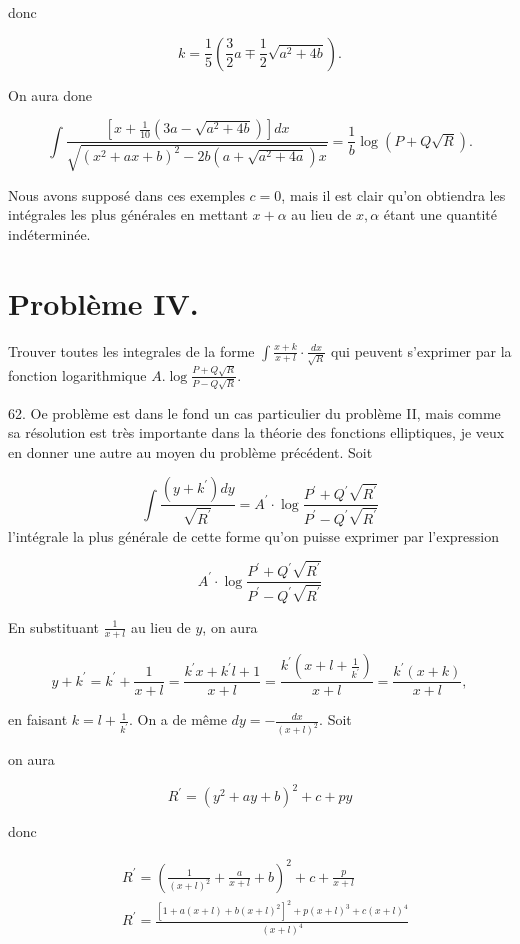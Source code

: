 \documentclass{article}
\begin{document}
donc

\[
k=\frac{1}{5}\left(\frac{3}{2} a \mp \frac{1}{2} \sqrt{a^{2}+4 b}\right) .
\]

On aura done

\[
\int \frac{\left[x+\frac{1}{10}\left(3 a-\sqrt{a^{2}+4 b}\right)\right] d x}{\sqrt{\left(x^{2}+a x+b\right)^{2}-2 b\left(a+\sqrt{a^{2}+4 a}\right) x}}=\frac{1}{b} \log (P+Q \sqrt{R}) .
\]

Nous avons supposé dans ces exemples \(c=0\), mais il est clair qu'on obtiendra les intégrales les plus générales en mettant \(x+\alpha\) au lieu de \(x, \alpha\) étant une quantité indéterminée.

\section*{Problème IV.}

Trouver toutes les integrales de la forme \(\int \frac{x+k}{x+l} \cdot \frac{d x}{\sqrt{R}}\) qui peuvent s'exprimer par la fonction logarithmique \(A . \log \frac{P+Q \sqrt{R}}{P-Q \sqrt{R}}\).

62. Oe problème est dans le fond un cas particulier du problème II, mais comme sa résolution est très importante dans la théorie des fonctions elliptiques, je veux en donner une autre au moyen du problème précédent. Soit

\[
\int \frac{\left(y+k^{\prime}\right) d y}{\sqrt{R^{\prime}}}=A^{\prime} \cdot \log \frac{P^{\prime}+Q^{\prime} \sqrt{R^{\prime}}}{P^{\prime}-Q^{\prime} \sqrt{R^{\prime}}}
\]
l'intégrale la plus générale de cette forme qu'on puisse exprimer par l'expression

\[
A^{\prime} \cdot \log \frac{P^{\prime}+Q^{\prime} \sqrt{R^{\prime}}}{P^{\prime}-Q^{\prime} \sqrt{R^{\prime}}}
\]

En substituant \(\frac{1}{x+l}\) au lieu de \(y\), on aura

\[
y+k^{\prime}=k^{\prime}+\frac{1}{x+l}=\frac{k^{\prime} x+k^{\prime} l+1}{x+l}=\frac{k^{\prime}\left(x+l+\frac{1}{k^{\prime}}\right)}{x+l}=\frac{k^{\prime}(x+k)}{x+l},
\]

en faisant \(k=l+\frac{1}{k^{\prime}}\). On a de même \(d y=-\frac{d x}{(x+l)^{2}}\). Soit

on aura

\[
R^{\prime}=\left(y^{2}+a y+b\right)^{2}+c+p y
\]

donc

\[
\begin{aligned}
& R^{\prime}=\left(\frac{1}{(x+l)^{2}}+\frac{a}{x+l}+b\right)^{2}+c+\frac{p}{x+l} \\
& R^{\prime}=\frac{\left[1+a(x+l)+b(x+l)^{2}\right]^{2}+p(x+l)^{3}+c(x+l)^{4}}{(x+l)^{4}}
\end{aligned}
\]
\end{document}
